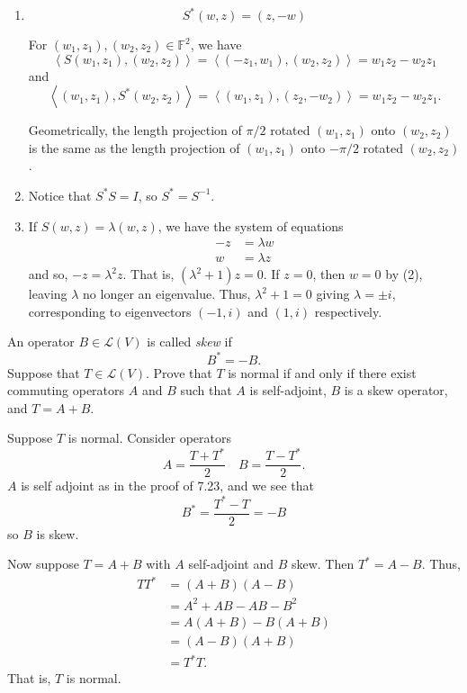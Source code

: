 \documentclass[12 pt, letterpaper]{hmcpset}
\begin{document}
\begin{solution}
	\begin{enumerate}
		\item
			\[
				\boxed{
					S^{*}(w, z) = (z, -w)
				}
			\]

			For $(w_{1}, z_{1}), (w_{2}, z_{2}) \in \mathbb{F}^{2}$, we have
			\[
				\left < S(w_{1}, z_{1}), (w_{2}, z_{2}) \right > = \left < (- z_{1}, w_{1}), (w_{2}, z_{2}) \right > = w_{1} z_{2} - w_{2} z_{1}
			\]
			and
			\[
				\left < (w_{1}, z_{1}), S^{*}(w_{2}, z_{2}) \right > = \left < (w_{1}, z_{1}), (z_{2}, - w_{2}) \right > = w_{1} z_{2} - w_{2} z_{1}.
			\]

			Geometrically, the length projection of $\pi/ 2$ rotated $(w_{1}, z_{1})$ onto $(w_{2}, z_{2})$ is the same as the length projection of $(w_{1}, z_{1})$ onto $-\pi / 2$ rotated $(w_{2}, z_{2})$.
		\item Notice that $S^{*} S = I$, so $S^{*} = S^{-1}$.
		\item If $S(w, z) = \lambda (w, z)$, we have the system of equations
			\begin{align}
				-z & = \lambda w \\
				w & = \lambda z
			\end{align}
			and so, $-z = \lambda^{2} z$. That is, $(\lambda^{2} + 1) z = 0$. If $z = 0$, then $w = 0$ by (2), leaving $\lambda$ no longer an eigenvalue. Thus, $\lambda^{2} + 1 = 0$ giving $\lambda = \pm i$, corresponding to eigenvectors $(-1, i)$ and $(1, i)$ respectively.
	\end{enumerate}
\end{solution}

\pagebreak

\begin{problem}[12]
	An operator $B \in \mathcal{L}(V)$ is called \emph{skew} if
	\[
		B^{*} = -B.
	\]
	Suppose that $T \in \mathcal{L}(V)$. Prove that $T$ is normal if and only if there exist commuting operators $A$ and $B$ such that $A$ is self-adjoint, $B$ is a skew operator, and $T = A + B$.
\end{problem}

\begin{solution}
	Suppose $T$ is normal. Consider operators
	\[
		A = \frac{T + T^{*}}{2} \quad B = \frac{T - T^{*}}{2}.
	\]
	$A$ is self adjoint as in the proof of 7.23, and we see that
	\[
		B^{*} = \frac{T^{*} - T}{2} = - B
	\]
	so $B$ is skew.

	Now suppose $T = A + B$ with $A$ self-adjoint and $B$ skew. Then $T^{*} = A - B$. Thus,
	\begin{align*}
		T T^{*} & = (A + B)(A - B) \\
			& = A^{2} + AB - AB - B^{2} \\
			& = A(A + B) - B(A + B) \\
			& = (A - B)(A + B) \\
			& = T^{*} T.
	\end{align*}
	That is, $T$ is normal.
\end{solution}
\end{document}
